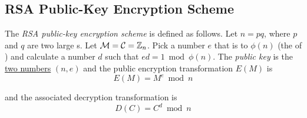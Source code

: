 \subsection{RSA Public-Key Encryption Scheme}\label{subsec:RSA_Public_Key_Encryption_Scheme}
\begin{definition}\label{def:RSA_Public_Key_Encryption_Scheme}
  The \emph{RSA public-key encryption scheme} is defined as follows.
  Let $n = pq$, where $p$ and $q$ are two large s.
  Let $\operatorname{\mathcal{M}} = \operatorname{\mathcal{C}} = \operatorname{\mathbb{Z}}_{n}$.
  Pick a number $e$ that is  to $\phi(n)$ (the  of ) and calculate a number $d$ such that $ed = 1 \bmod \phi(n)$.
  The \emph{public key} is the \underline{two numbers} $(n, e)$ and the public encryption transformation $E(M)$ is
  \begin{equation}\label{eq:RSA_Public_Key_Encryption_Scheme-Encryption}
    E(M) = M^{e} \bmod n
  \end{equation}

  and the associated decryption transformation is
  \begin{equation}
    \label{eq:RSA_Public_Key_Encryption_Scheme-Decryption}
    D(C) = C^{d} \bmod n
  \end{equation}
\end{definition}

